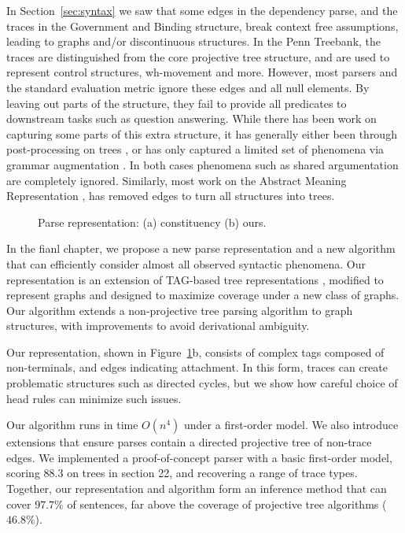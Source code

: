 In Section~\ref{sec:syntax} we saw that some edges in the dependency parse, and the traces in the Government and Binding structure, break context free assumptions, leading to graphs and/or discontinuous structures.
In the Penn Treebank, the traces are distinguished from the core projective tree structure, and are used to represent control structures, wh-movement and more.
However, most parsers and the standard evaluation metric ignore these edges and all null elements.
By leaving out parts of the structure, they fail to provide all predicates to downstream tasks such as question answering.
While there has been work on capturing some parts of this extra structure, it has generally either been through post-processing on trees \parencite{Johnson:2002,Jijkoun:2003,Campbell:2004,Levy:2004,Gabbard:2006}, or has only captured a limited set of phenomena via grammar augmentation \parencite{collins:1997,dienes-dubey:2003,schmid:2006,cai-chiang-goldberg:2011}.
In both cases phenomena such as shared argumentation are completely ignored.
Similarly, most work on the Abstract Meaning Representation \parencite{amr}, has removed edges to turn all structures into trees.

\begin{figure}
  \centering
  \scalebox{1.0}{
    
  }
  \caption{\label{fig:repr}
    Parse representation: (a) constituency (b) ours.
  }
\end{figure}

In the fianl chapter, we propose a new parse representation and a new algorithm that can efficiently consider almost all observed syntactic phenomena.
Our representation is an extension of TAG-based tree representations \parencite{cck,Shen:2007}, modified to represent graphs and designed to maximize coverage under a new class of graphs.
Our algorithm extends a non-projective tree parsing algorithm \parencite{ec} to graph structures, with improvements to avoid derivational ambiguity.

Our representation, shown in Figure~\ref{fig:repr}b, consists of complex tags composed of non-terminals, and edges indicating attachment.
In this form, traces can create problematic structures such as directed cycles, but we show how careful choice of head rules can minimize such issues.

Our algorithm runs in time $O(n^4)$ under a first-order model.
We also introduce extensions that ensure parses contain a directed projective tree of non-trace edges.
We implemented a proof-of-concept parser with a basic first-order model, scoring $88.3$ on trees in section 22, and recovering a range of trace types.
Together, our representation and algorithm form an inference method that can cover $97.7\%$ of sentences, far above the coverage of projective tree algorithms ($46.8\%$).

